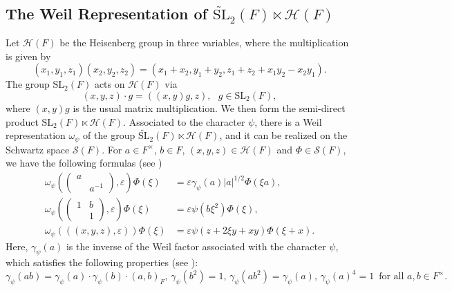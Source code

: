 \documentclass[11pt]{amsart}
\theoremstyle{definition}
\theoremstyle{remark}
\begin{document}
\subsection{The Weil Representation of $\widetilde{\mathrm{SL}}_2(F)\ltimes\mathcal{H}(F)$}
\label{subsection-Weil-representation}
Let $\mathcal{H}(F)$ be the Heisenberg group in three variables, where the multiplication is given by
$$
(x_1, y_1, z_1) (x_2, y_2, z_2)= (x_1+x_2, y_1+y_2, z_1+z_2+x_1y_2-x_2y_1).
$$
The group $\mathrm{SL}_2(F)$ acts on $\mathcal{H}(F)$ via
$$
(x, y, z) \cdot g =((x, y)g, z), \ \ \ g\in \mathrm{SL}_2(F),
$$
where $(x, y)g$ is the usual matrix multiplication. We then form the semi-direct product $\mathrm{SL}_2(F)\ltimes \mathcal{H}(F)$. Associated to the character $\psi$, there is a Weil representation $\omega_\psi$ of the group $ \widetilde{\mathrm{SL}}_2(F) \ltimes \mathcal{H}(F)$, and it can be realized on the Schwartz space $\mathcal{S}(F)$. For $a\in F^\times$, $b\in F$, $(x, y, z)\in \mathcal{H}(F)$ and $\Phi\in \mathcal{S}(F)$, we have the following formulas (see \cite[Sections 2.2 and 2.5]{BerndtSchmidt1998})
\begin{equation*}
\begin{split}
 \omega_\psi  \left( \left(\begin{smallmatrix} a &\\&a^{-1} \end{smallmatrix}\right), \varepsilon \right) \Phi (\xi)       &=  \varepsilon \gamma_\psi(a) |a|^{{1/2}}   \Phi(\xi a),  \\
  \omega_\psi \left( \left(\begin{smallmatrix} 1 & b\\&1 \end{smallmatrix}\right) , \varepsilon\right) \Phi (\xi)       &= \varepsilon \psi(b\xi^2)\Phi(\xi),\\
  \omega_\psi(((x, y, z), \varepsilon) )\Phi(\xi)      & =  \varepsilon\psi(z+2\xi y+xy )\Phi(\xi+x).
\end{split}
\end{equation*}
Here, $\gamma_\psi(a)$ is the inverse of the Weil factor associated with the character $\psi$, which satisfies the following properties (see \cite[Appendix]{Rao1993}):
\begin{equation*}
    \gamma_\psi(a b)=\gamma_\psi(a)\cdot \gamma_\psi(b) \cdot (a,b)_F,\, 
    \gamma_\psi(b^2)=1,\,  \gamma_\psi(ab^2)=\gamma_\psi(a),\,  \gamma_\psi(a)^4=1\, \text{ for all } a, b\in F^\times.
\end{equation*}
\end{document}

